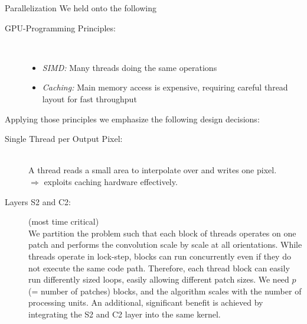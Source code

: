 \documentclass[final]{beamer}
\begin{document}
\begin{frame}{}
\begin{columns}[t]
\begin{column}{.48\linewidth}
        \begin{block}{Parallelization}
We held onto the following
\begin{description}
\item[GPU-Programming Principles:]~
	\begin{itemize}
		\item \emph{SIMD:} Many threads doing the same operations
		\item \emph{Caching:} Main memory access is expensive, requiring careful thread layout for fast throughput
	\end{itemize}
\end{description}
Applying those principles we emphasize the following design decisions:
\begin{description}
\item[Single Thread per Output Pixel:]~\\
A thread reads a small area to interpolate over and writes one pixel.\\
$\Rightarrow$ exploits caching hardware effectively.

\item[Layers S2 and C2:] (most time critical)\\
We partition the problem such that each block of threads operates on one patch and performs the convolution scale by scale at all orientations. \nesline
While threads operate in lock-step, blocks can run concurrently even if they do not execute the same code path. Therefore, each thread block can easily run differently sized loops, easily allowing different patch sizes. We need $p$ (= number of patches) blocks, and the algorithm scales
with the number of processing units. \newline
An additional, significant benefit is achieved by integrating the S2
and C2 layer into the same kernel.

\end{description}

        \end{block}        
        
        
      \end{column}
      
      

\end{columns}
\end{frame}
\end{document}
